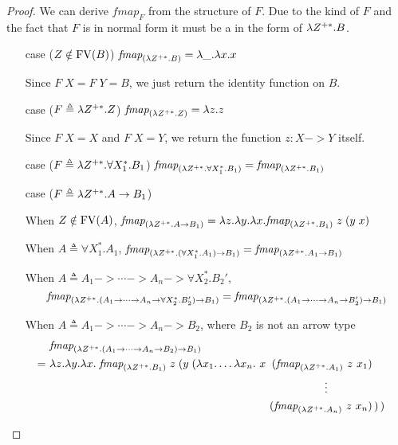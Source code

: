 \begin{proof}
	We can derive $\textit{fmap}_F$ from the structure of $F$.
	Due to the kind of $F$ and the fact that $F$ is in normal form
	it must be a in the form of $\lambda Z^{+*}.B$.
\begin{itemize}
\item[case]($Z\notin \mathop{\mathrm{FV}}(B)$)
	$ \textit{fmap}_{(\lambda Z^{+*}. B)} = \lambda \_ . \lambda x. x $

	Since $F\;X = F\;Y = B$, we just return the identity function on $B$.

\item[case]($F \triangleq \lambda Z^{+*}. Z$)
	$ \textit{fmap}_{(\lambda Z^{+*}. Z)} = \lambda z . z $

	Since $F\;X = X$ and $F\;X = Y$,
	we return the function $z:X -> Y$ itself.

\item[case]($F \triangleq \lambda Z^{+*}. \forall X_1^{*} .B_1$)
	$\textit{fmap}_{(\lambda Z^{+*}. \forall X_1^{*} .B_1)}
	= \textit{fmap}_{(\lambda Z^{+*}.B_1)}$

\item[case]($F \triangleq \lambda Z^{+*}. A -> B_1$)

	When $Z\notin\mathop{\mathrm{FV}}(A)$,
	$\textit{fmap}_{(\lambda Z^{+*}.A -> B_1)}
	= \lambda z.\lambda y. \lambda x. \textit{fmap}_{(\lambda Z^{+*}.B_1)} \; z \; (y \; x)$

	When $A \triangleq \forall X_1^{*}.A_1$,
	$\textit{fmap}_{(\lambda Z^{+*}.(\forall X_1^{*}.A_1) -> B_1)}
	= \textit{fmap}_{(\lambda Z^{+*}.A_1 -> B_1)}$

	\begin{singlespace}
	When $A \triangleq A_1 -> \cdots -> A_n -> \forall X_2^{*}.B_2'$,
	\vspace{-1.5ex}
	\[\textit{fmap}_{(\lambda Z^{+*}.(A_1 -> \cdots -> A_n -> \forall X_2^{*}.B_2') -> B_1)}
	= \textit{fmap}_{(\lambda Z^{+*}.(A_1 -> \cdots -> A_n -> B_2') -> B_1)} \]

	When $A \triangleq A_1 -> \cdots -> A_n -> B_2$,
	where $B_2$ is not an arrow type
	\vspace{-1.5ex}
	\begin{align*}
	  & \textit{fmap}_{(\l Z^{+*}.(A_1 -> \cdots -> A_n -> B_2) -> B_1)} \\
	=~& \l z.\l y. \l x.\;
	\textit{fmap}_{(\l Z^{+*}.B_1)} \; z \;
		(y \; (\l x_1.\ldots\l x_n. ~
		   x  &\!\!\!\!(\textit{fmap}_{(\l Z^{+*}.A_1)} ~ z ~ x_1)& \\
		     &&\!\!\!\!\vdots \qquad\qquad& \\
		     &&\!\!\!\!(\textit{fmap}_{(\l Z^{+*}.A_n)} ~ z ~ x_n)&
		\,) \,)
	\end{align*}
	\end{singlespace}

\end{itemize}
\end{proof}

